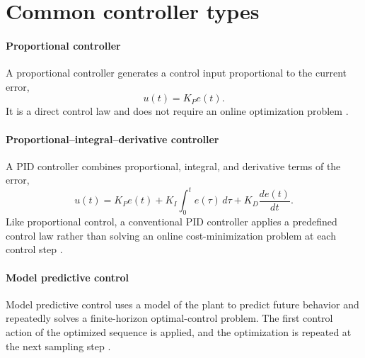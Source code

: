 \documentclass[a4paper]{article}
\begin{document}
   \section{Common controller types}
      \paragraph{Proportional controller}
      A proportional controller generates a control input proportional to the current error,
      \[
         u(t)=K_P e(t).
      \]
      It is a direct control law and does not require an online optimization problem \cite{astrom-2008-feedback-systems-an-introduction-for-scientists-and-engineers}.


      \paragraph{Proportional--integral--derivative controller}
      A PID controller combines proportional, integral, and derivative terms of the error,
      \[
         u(t)
         =
         K_P e(t)
         +
         K_I\int_0^t e(\tau)\,d\tau
         +
         K_D\frac{de(t)}{dt}.
      \]
      Like proportional control, a conventional PID controller applies a predefined control law rather than solving an online cost-minimization problem at each control step \cite{astrom-2008-feedback-systems-an-introduction-for-scientists-and-engineers}.


      \paragraph{Model predictive control}
      Model predictive control uses a model of the plant to predict future behavior and repeatedly solves a finite-horizon optimal-control problem. The first control action of the optimized sequence is applied, and the optimization is repeated at the next sampling step \cite{mayne-2000-constrained-model-predictive-control-stability-and-optimality}.

\end{document}

